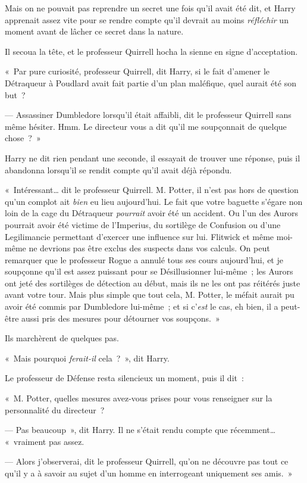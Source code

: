 Mais on ne pouvait pas reprendre un secret une fois qu'il avait été dit, et Harry apprenait assez vite pour se rendre compte qu'il devrait au moins \emph{réfléchir} un moment avant de lâcher ce secret dans la nature.

Il secoua la tête, et le professeur Quirrell hocha la sienne en signe d'acceptation.

«~Par pure curiosité, professeur Quirrell, dit Harry, si le fait d'amener le Détraqueur à Poudlard avait fait partie d'un plan maléfique, quel aurait été son but~?

--- Assassiner Dumbledore lorsqu'il était affaibli, dit le professeur Quirrell sans même hésiter. Hmm. Le directeur vous a dit qu'il me soupçonnait de quelque chose~?~»

Harry ne dit rien pendant une seconde, il essayait de trouver une réponse, puis il abandonna lorsqu'il se rendit compte qu'il avait déjà répondu.

«~Intéressant… dit le professeur Quirrell. M. Potter, il n'est pas hors de question qu'un complot ait \emph{bien} eu lieu aujourd'hui. Le fait que votre baguette s'égare non loin de la cage du Détraqueur \emph{pourrait} avoir été un accident. Ou l'un des Aurors pourrait avoir été victime de l'Imperius, du sortilège de Confusion ou d'une Legilimancie permettant d'exercer une influence sur lui. Flitwick et même moi-même ne devrions pas être exclus des suspects dans vos calculs. On peut remarquer que le professeur Rogue a annulé tous ses cours aujourd'hui, et je soupçonne qu'il est assez puissant pour se Désillusionner lui-même~; les Aurors ont jeté des sortilèges de détection au début, mais ils ne les ont pas réitérés juste avant votre tour. Mais plus simple que tout cela, M. Potter, le méfait aurait pu avoir été commis par Dumbledore lui-même~; et si c'\emph{est} le cas, eh bien, il a peut-être aussi pris des mesures pour détourner vos soupçons.~»

Ils marchèrent de quelques pas.

«~Mais pourquoi \emph{ferait-il} cela~?~», dit Harry.

Le professeur de Défense resta silencieux un moment, puis il dit~:

«~M. Potter, quelles mesures avez-vous prises pour vous renseigner sur la personnalité du directeur~?

--- Pas beaucoup~», dit Harry. Il ne s'était rendu compte que récemment… «~vraiment pas assez.

--- Alors j'observerai, dit le professeur Quirrell, qu'on ne découvre pas tout ce qu'il y a à savoir au sujet d'un homme en interrogeant uniquement ses amis.~»

